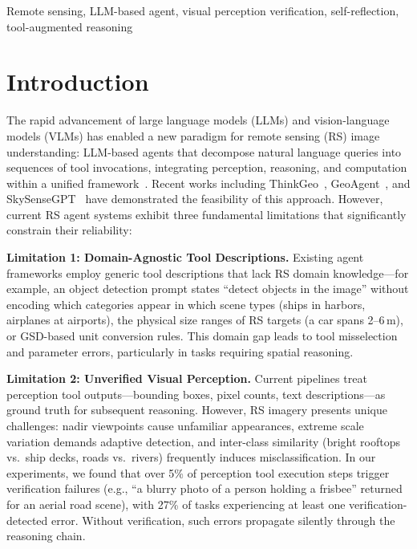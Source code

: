 \documentclass[journal]{IEEEtran}
\begin{document}
\begin{IEEEkeywords}
Remote sensing, LLM-based agent, visual perception verification, self-reflection, tool-augmented reasoning
\end{IEEEkeywords}

\section{Introduction}
\label{sec:introduction}

The rapid advancement of large language models (LLMs) and vision-language models (VLMs) has enabled a new paradigm for remote sensing (RS) image understanding: LLM-based agents that decompose natural language queries into sequences of tool invocations, integrating perception, reasoning, and computation within a unified framework~\cite{ThinkGeo}.
Recent works including ThinkGeo~\cite{ThinkGeo}, GeoAgent~\cite{GeoAgent}, and SkySenseGPT~\cite{SkySenseGPT} have demonstrated the feasibility of this approach.
However, current RS agent systems exhibit three fundamental limitations that significantly constrain their reliability:

\textbf{Limitation 1: Domain-Agnostic Tool Descriptions.}
Existing agent frameworks employ generic tool descriptions that lack RS domain knowledge---for example, an object detection prompt states ``detect objects in the image'' without encoding which categories appear in which scene types (ships in harbors, airplanes at airports), the physical size ranges of RS targets (a car spans 2--6\,m), or GSD-based unit conversion rules.
This domain gap leads to tool misselection and parameter errors, particularly in tasks requiring spatial reasoning.

\textbf{Limitation 2: Unverified Visual Perception.}
Current pipelines treat perception tool outputs---bounding boxes, pixel counts, text descriptions---as ground truth for subsequent reasoning.
However, RS imagery presents unique challenges: nadir viewpoints cause unfamiliar appearances, extreme scale variation demands adaptive detection, and inter-class similarity (bright rooftops vs.\ ship decks, roads vs.\ rivers) frequently induces misclassification.
In our experiments, we found that over 5\% of perception tool execution steps trigger verification failures (e.g., ``a blurry photo of a person holding a frisbee'' returned for an aerial road scene), with 27\% of tasks experiencing at least one verification-detected error.
Without verification, such errors propagate silently through the reasoning chain.
\end{document}
